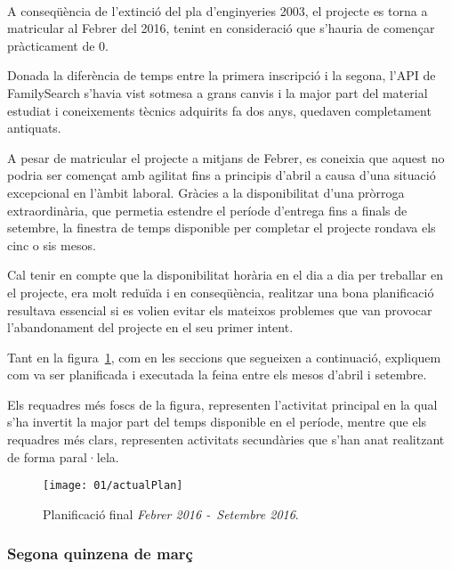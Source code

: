         \paragraph{}
        A  conseqüència de l’extinció del pla d’enginyeries 2003, el projecte es torna a matricular al Febrer del 2016, tenint en consideració que s'hauria de començar pràcticament de 0.

        Donada la diferència de temps entre la primera inscripció i la segona, l’\gls{API} de FamilySearch s'havia vist sotmesa a grans canvis i la major part del material estudiat i coneixements tècnics adquirits fa dos anys, quedaven completament antiquats.

        A pesar de matricular el projecte a mitjans de Febrer, es coneixia que aquest no podria ser començat amb agilitat fins a principis d’abril a causa d'una situació excepcional en l'àmbit laboral. Gràcies a la disponibilitat d’una pròrroga extraordinària, que permetia estendre el període d'entrega fins a finals de setembre, la finestra de temps disponible per completar el projecte rondava els cinc o sis mesos.

        Cal tenir en compte que la disponibilitat horària en el dia a dia per treballar en el projecte, era molt reduïda i en conseqüència, realitzar una bona planificació resultava essencial si es volien evitar els mateixos problemes que van provocar l’abandonament del projecte en el seu primer intent.

        Tant en la figura~\ref{fig:actualPlan}, com en les seccions que segueixen a continuació, expliquem com va ser planificada i executada la feina entre els mesos d'abril i setembre.

        Els requadres més foscs de la figura, representen l'activitat principal en la qual s'ha invertit la major part del temps disponible en el període, mentre que els requadres més clars, representen activitats secundàries que s'han anat realitzant de forma paral·lela.

        \begin{figure}[h]
            \texttt{[image: 01/actualPlan]}
            \centering
            \caption{Planificació final \emph{Febrer 2016 -\ Setembre 2016}.\label{fig:actualPlan}}
        \end{figure}

        \subsubsection{Segona quinzena de març}

